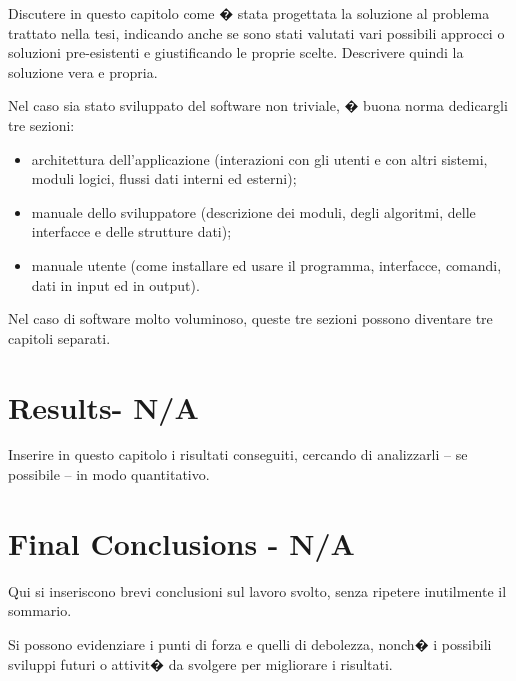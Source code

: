 \documentclass[%
  cucitura%
  ,english
  ,12pt%
  ,openright
  ]{toptesi}
\begin{document}
Discutere in questo capitolo come � stata progettata la soluzione al problema trattato nella tesi, indicando anche se sono stati valutati vari possibili approcci o soluzioni pre-esistenti e giustificando le proprie scelte. Descrivere quindi la soluzione vera e propria.

Nel caso sia stato sviluppato del software non triviale, � buona norma dedicargli tre sezioni:
\begin{itemize}
\item architettura dell'applicazione (interazioni con gli utenti e con altri sistemi, moduli logici, flussi dati interni ed esterni);
\item manuale dello sviluppatore (descrizione dei moduli, degli algoritmi, delle interfacce e delle strutture dati);
\item manuale utente (come installare ed usare il programma, interfacce, comandi, dati in input ed in output).
\end{itemize}
Nel caso di software molto voluminoso, queste tre sezioni possono diventare tre capitoli separati.

\chapter{Results- N/A}

Inserire in questo capitolo i risultati conseguiti, cercando di analizzarli -- se possibile -- in modo quantitativo.


\chapter{Final Conclusions - N/A}

Qui si inseriscono brevi conclusioni sul lavoro svolto, senza ripetere inutilmente il sommario.

Si possono evidenziare i punti di forza e quelli di debolezza, nonch� i possibili sviluppi futuri o attivit� da svolgere per migliorare i risultati.



%
%
\end{document}
